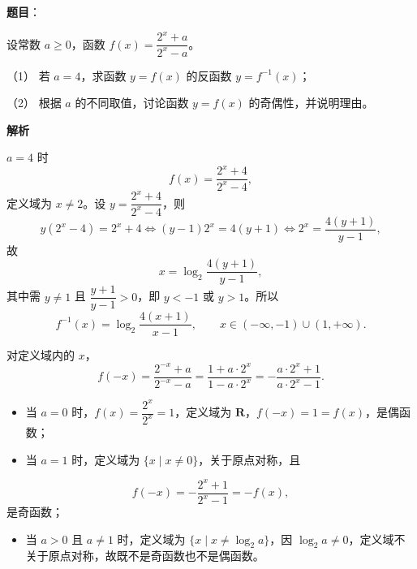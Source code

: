 \begin{answer}

\textbf{题目}：

设常数 $a\geqslant0$，函数 $f(x)=\dfrac{2^x+a}{2^x-a}$。

（1） 若 $a=4$，求函数 $y=f(x)$ 的反函数 $y=f^{-1}(x)$；

（2） 根据 $a$ 的不同取值，讨论函数 $y=f(x)$ 的奇偶性，并说明理由。

\textbf{解析}


$a=4$ 时
\nopagebreak[4]
\[f(x)=\frac{2^x+4}{2^x-4},\]
定义域为 $x\neq2$。设 $y=\dfrac{2^x+4}{2^x-4}$，则
\nopagebreak[4]
\[y(2^x-4)=2^x+4\iff (y-1)2^x=4(y+1)\iff2^x=\frac{4(y+1)}{y-1},\]
故
\nopagebreak[4]
\[x=\log_2\frac{4(y+1)}{y-1},\]
其中需 $y\neq1$ 且 $\dfrac{y+1}{y-1}>0$，即 $y<-1$ 或 $y>1$。所以
\nopagebreak[4]
\[f^{-1}(x)=\log_2\frac{4(x+1)}{x-1},\qquad x\in(-\infty,-1)\cup(1,+\infty).\]


对定义域内的 $x$，
\nopagebreak[4]
\[f(-x)=\frac{2^{-x}+a}{2^{-x}-a}=\frac{1+a\cdot2^x}{1-a\cdot2^x}=-\frac{a\cdot2^x+1}{a\cdot2^x-1}.\]

\begin{itemize}
\item 当 $a=0$ 时，$f(x)=\dfrac{2^x}{2^x}=1$，定义域为 $\mathbf R$，$f(-x)=1=f(x)$，是偶函数；
\item 当 $a=1$ 时，定义域为 $\{x\mid x\neq0\}$，关于原点对称，且
\end{itemize}
\nopagebreak[4]
\[f(-x)=-\frac{2^x+1}{2^x-1}=-f(x),\]
是奇函数；
\begin{itemize}
\item 当 $a>0$ 且 $a\neq1$ 时，定义域为 $\{x\mid x\neq\log_2a\}$，因 $\log_2a\neq0$，定义域不关于原点对称，故既不是奇函数也不是偶函数。
\end{itemize}



\end{answer}
